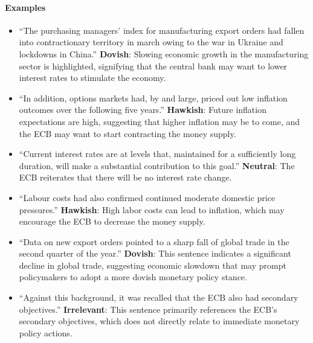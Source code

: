 \paragraph{Examples}
\begin{itemize}
    \item ``The purchasing managers’ index for manufacturing export orders had fallen into contractionary territory in march owing to the war in Ukraine and lockdowns in China.'' \newline
    \textbf{Dovish}: Slowing economic growth in the manufacturing sector is highlighted, signifying that the central bank may want to lower interest rates to stimulate the economy.
    
    \item ``In addition, options markets had, by and large, priced out low inflation outcomes over the following five years.'' \newline
    \textbf{Hawkish}: Future inflation expectations are high, suggesting that higher inflation may be to come, and the ECB may want to start contracting the money supply.
    
    \item ``Current interest rates are at levels that, maintained for a sufficiently long duration, will make a substantial contribution to this goal.'' \newline
    \textbf{Neutral}: The ECB reiterates that there will be no interest rate change.
    
    \item ``Labour costs had also confirmed continued moderate domestic price pressures.'' \newline
    \textbf{Hawkish}: High labor costs can lead to inflation, which may encourage the ECB to decrease the money supply.
    
    \item ``Data on new export orders pointed to a sharp fall of global trade in the second quarter of the year.'' \newline
    \textbf{Dovish}: This sentence indicates a significant decline in global trade, suggesting economic slowdown that may prompt policymakers to adopt a more dovish monetary policy stance.
    
    \item ``Against this background, it was recalled that the ECB also had secondary objectives.'' \newline
    \textbf{Irrelevant}: This sentence primarily references the ECB’s secondary objectives, which does not directly relate to immediate monetary policy actions.
\end{itemize}

